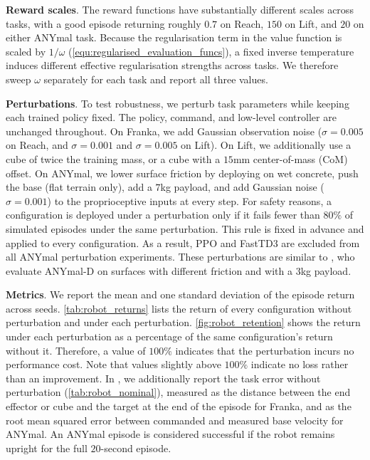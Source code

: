 \textbf{Reward scales}.
The reward functions have substantially different scales across tasks, with a good episode returning roughly $0.7$ on Reach, $150$ on Lift, and $20$ on either ANYmal task.
Because the regularisation term in the value function is scaled by $1/\omega$ (\autoref{equ:regularised_evaluation_funcs}), a fixed inverse temperature induces different effective regularisation strengths across tasks.
We therefore sweep $\omega$ separately for each task and report all three values.


\textbf{Perturbations}.
To test robustness, we perturb task parameters while keeping each trained policy fixed. The policy, command, and low-level controller are unchanged throughout. 
On Franka, we add Gaussian observation noise ($\sigma=0.005$ on Reach, and $\sigma=0.001$ and $\sigma=0.005$ on Lift). On Lift, we additionally use a cube of twice the training mass, or a cube with a $15$mm center-of-mass (CoM) offset. 
On ANYmal, we lower surface friction by deploying on wet concrete, push the base (flat terrain only), add a $7$kg payload, and add Gaussian noise ($\sigma=0.001$) to the proprioceptive inputs at every step. For safety reasons, a configuration is deployed under a perturbation only if it fails fewer than $80\%$ of simulated episodes under the same perturbation. This rule is fixed in advance and applied to every configuration. As a result, PPO and FastTD3 are excluded from all ANYmal perturbation experiments.
These perturbations are similar to \citet{danesh2025safe}, who evaluate ANYmal-D on surfaces with different friction and with a $3$kg payload.


\textbf{Metrics}.
We report the mean and one standard deviation of the episode return across seeds. \autoref{tab:robot_returns} lists the return of every configuration without perturbation and under each perturbation. \autoref{fig:robot_retention} shows the return under each perturbation as a percentage of the same configuration's return without it. Therefore, a value of $100\%$ indicates that the perturbation incurs no performance cost. Note that values slightly above $100\%$ indicate no loss rather than an improvement. In , we additionally report the task error without perturbation (\autoref{tab:robot_nominal}), measured as the distance between the end effector or cube and the target at the end of the episode for Franka, and as the root mean squared error between commanded and measured base velocity for ANYmal.
An ANYmal episode is considered successful if the robot remains upright for the full $20$-second episode.



